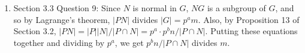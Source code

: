 \documentclass{article}
\begin{document}
\begin{enumerate}
  \item Section 3.3 Question 9: Since $N$ is normal in $G$, $NG$ is a
    subgroup of $G$, and so by Lagrange's theorem, $|PN|$ divides $|G|=p^am$.
    Also, by Proposition 13 of Section 3.2, $|PN|=|P||N|/|P\cap
    N|=p^a\cdot p^bn/|P\cap N|$. Putting these equations together and
    dividing by $p^a$, we get $p^bn/|P\cap N|$ divides $m$.
\end{enumerate}
\end{document}
